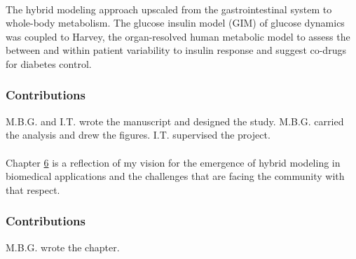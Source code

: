 \\
\noindent The hybrid modeling approach upscaled from the gastrointestinal system to whole-body metabolism. The glucose insulin model (GIM) of glucose dynamics \cite{schaller2013generic} was coupled to Harvey, the organ-resolved human metabolic model to assess the between and within patient variability to insulin response and suggest co-drugs for diabetes control.
\subsubsection{Contributions}
M.B.G. and I.T. wrote the manuscript and designed the study. M.B.G. carried the analysis and drew the figures. I.T. supervised the project.\\

\\
\noindent Chapter \hyperref[ch:chapter6]{6} is a reflection of my vision for the emergence of hybrid modeling in biomedical applications and the challenges that are facing the community with that respect.
\subsubsection{Contributions}
M.B.G. wrote the chapter.
\\
\\


